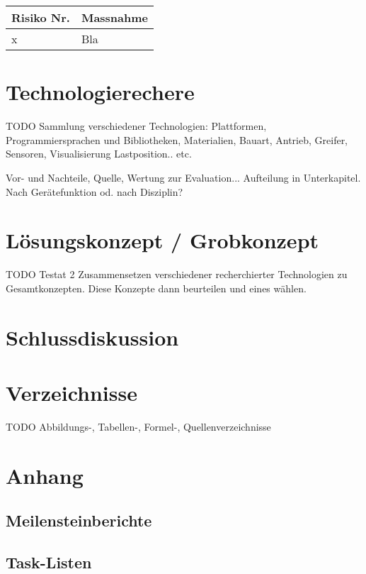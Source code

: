 \documentclass[a4paper]{report}
\begin{document}
\vspace{1em}
\noindent
\begin{tabular}{|l|l|}
	\hline 
	\textbf{Risiko Nr.} & \textbf{Massnahme} \\
	\hline
	x & Bla \\
	\hline
\end{tabular}

\chapter{Technologierechere}
TODO Sammlung verschiedener Technologien: Plattformen, Programmiersprachen und Bibliotheken, Materialien, Bauart, Antrieb, Greifer, Sensoren, Visualisierung Lastposition.. etc. 

Vor- und Nachteile, Quelle, Wertung zur Evaluation... 
Aufteilung in Unterkapitel. Nach Gerätefunktion od. nach Disziplin? 

\chapter{Lösungskonzept / Grobkonzept}
TODO Testat 2
Zusammensetzen verschiedener recherchierter Technologien zu Gesamtkonzepten. Diese Konzepte dann beurteilen und eines wählen. 

\chapter{Schlussdiskussion}

\chapter{Verzeichnisse}
TODO Abbildungs-, Tabellen-, Formel-, Quellenverzeichnisse
\printbibliography

\chapter{Anhang}
\section{Meilensteinberichte}

\section{Task-Listen}
\end{document}
